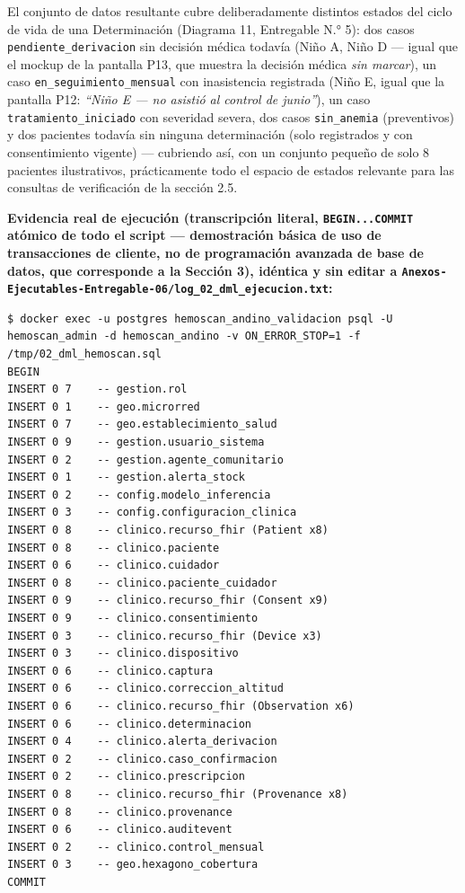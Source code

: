 \documentclass[11pt,a4paper]{article}
\begin{document}
El conjunto de datos resultante cubre deliberadamente distintos estados del ciclo de vida de una Determinación (Diagrama 11, Entregable N.° 5): dos casos \texttt{pendiente\_derivacion} sin decisión médica todavía (Niño A, Niño D --- igual que el mockup de la pantalla P13, que muestra la decisión médica \emph{sin marcar}), un caso \texttt{en\_seguimiento\_mensual} con inasistencia registrada (Niño E, igual que la pantalla P12: \emph{``Niño E --- no asistió al control de junio''}), un caso \texttt{tratamiento\_iniciado} con severidad severa, dos casos \texttt{sin\_anemia} (preventivos) y dos pacientes todavía sin ninguna determinación (solo registrados y con consentimiento vigente) --- cubriendo así, con un conjunto pequeño de solo 8 pacientes ilustrativos, prácticamente todo el espacio de estados relevante para las consultas de verificación de la sección 2.5.

\textbf{Evidencia real de ejecución (transcripción literal, \texttt{BEGIN...COMMIT} atómico de todo el script --- demostración básica de uso de transacciones de cliente, no de programación avanzada de base de datos, que corresponde a la Sección 3), idéntica y sin editar a \texttt{Anexos-Ejecutables-Entregable-06/log\_02\_dml\_ejecucion.txt}:}

\begin{samepage}\begin{verbatim}
$ docker exec -u postgres hemoscan_andino_validacion psql -U hemoscan_admin -d hemoscan_andino -v ON_ERROR_STOP=1 -f /tmp/02_dml_hemoscan.sql
BEGIN
INSERT 0 7    -- gestion.rol
INSERT 0 1    -- geo.microrred
INSERT 0 7    -- geo.establecimiento_salud
INSERT 0 9    -- gestion.usuario_sistema
INSERT 0 2    -- gestion.agente_comunitario
INSERT 0 1    -- gestion.alerta_stock
INSERT 0 2    -- config.modelo_inferencia
INSERT 0 3    -- config.configuracion_clinica
INSERT 0 8    -- clinico.recurso_fhir (Patient x8)
INSERT 0 8    -- clinico.paciente
INSERT 0 6    -- clinico.cuidador
INSERT 0 8    -- clinico.paciente_cuidador
INSERT 0 9    -- clinico.recurso_fhir (Consent x9)
INSERT 0 9    -- clinico.consentimiento
INSERT 0 3    -- clinico.recurso_fhir (Device x3)
INSERT 0 3    -- clinico.dispositivo
INSERT 0 6    -- clinico.captura
INSERT 0 6    -- clinico.correccion_altitud
INSERT 0 6    -- clinico.recurso_fhir (Observation x6)
INSERT 0 6    -- clinico.determinacion
INSERT 0 4    -- clinico.alerta_derivacion
INSERT 0 2    -- clinico.caso_confirmacion
INSERT 0 2    -- clinico.prescripcion
INSERT 0 8    -- clinico.recurso_fhir (Provenance x8)
INSERT 0 8    -- clinico.provenance
INSERT 0 6    -- clinico.auditevent
INSERT 0 2    -- clinico.control_mensual
INSERT 0 3    -- geo.hexagono_cobertura
COMMIT
\end{verbatim}\end{samepage}
\end{document}
